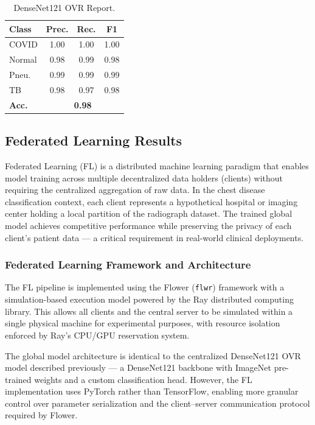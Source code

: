 \FloatBarrier

\renewcommand{\arraystretch}{1.2}

\begin{table}[htbp]
	\centering
	\caption{DenseNet121 OVR Report.}
	\label{tab:densenet_ovr_report}
	\small
	\begin{tabularx}{0.6\textwidth}{|X|c|c|c|}
		\hline
		\textbf{Class} & \textbf{Prec.} & \textbf{Rec.} & \textbf{F1} \\
		\hline
		COVID & 1.00 & 1.00 & 1.00 \\
		\hline
		Normal & 0.98 & 0.99 & 0.98 \\
		\hline
		Pneu. & 0.99 & 0.99 & 0.99 \\
		\hline
		TB & 0.98 & 0.97 & 0.98 \\
		\hline
		\textbf{Acc.} & \multicolumn{3}{c|}{\textbf{0.98}} \\
		\hline
	\end{tabularx}
\end{table}


\subsection{Federated Learning Results}
\label{sec:federated_results}

Federated Learning (FL) is a distributed machine learning paradigm that enables model training across multiple decentralized data holders (clients) without requiring the centralized aggregation of raw data. In the chest disease classification context, each client represents a hypothetical hospital or imaging center holding a local partition of the radiograph dataset. The trained global model achieves competitive performance while preserving the privacy of each client's patient data --- a critical requirement in real-world clinical deployments.

\subsubsection{Federated Learning Framework and Architecture}

The FL pipeline is implemented using the Flower (\texttt{flwr}) framework with a simulation-based execution model powered by the Ray distributed computing library. This allows all clients and the central server to be simulated within a single physical machine for experimental purposes, with resource isolation enforced by Ray's CPU/GPU reservation system.

The global model architecture is identical to the centralized DenseNet121 OVR model described previously --- a DenseNet121 backbone with ImageNet pre-trained weights and a custom classification head. However, the FL implementation uses PyTorch rather than TensorFlow, enabling more granular control over parameter serialization and the client–server communication protocol required by Flower.

